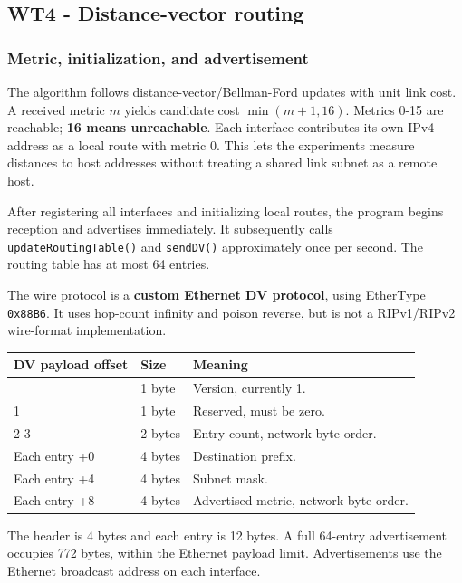 \documentclass[
  a4paper,
  10pt]{article}
\newcounter{none} %
\begin{document}
\newpage

\subsection{WT4 - Distance-vector
routing}\label{wt4---distance-vector-routing}

\subsubsection{Metric, initialization, and
advertisement}\label{metric-initialization-and-advertisement}

The algorithm follows distance-vector/Bellman-Ford updates with unit
link cost. A received metric \(m\) yields candidate cost
\(\min(m+1,16)\). Metrics 0-15 are reachable; \textbf{16 means
unreachable}. Each interface contributes its own IPv4 address as a local
{\ttfamily{}} route with metric 0. This lets the experiments
measure distances to host addresses without treating a shared link
subnet as a remote host.

After registering all interfaces and initializing local routes, the
program begins reception and advertises immediately. It subsequently
calls \texttt{updateRoutingTable()} and \texttt{sendDV()} approximately
once per second. The routing table has at most 64 entries.

The wire protocol is a \textbf{custom Ethernet DV protocol}, using
EtherType \texttt{0x88B6}. It uses hop-count infinity and poison
reverse, but is not a RIPv1/RIPv2 wire-format implementation.

{\def\LTcaptype{none} %
\begin{longtable}[]{@{}lll@{}}
\toprule\noalign{}
DV payload offset & Size & Meaning \\
\midrule\noalign{}
\endhead
\bottomrule\noalign{}
\endlastfoot
0 & 1 byte & Version, currently 1. \\
1 & 1 byte & Reserved, must be zero. \\
2-3 & 2 bytes & Entry count, network byte order. \\
Each entry +0 & 4 bytes & Destination prefix. \\
Each entry +4 & 4 bytes & Subnet mask. \\
Each entry +8 & 4 bytes & Advertised metric, network byte order. \\
\end{longtable}
}

The header is 4 bytes and each entry is 12 bytes. A full 64-entry
advertisement occupies 772 bytes, within the Ethernet payload limit.
Advertisements use the Ethernet broadcast address on each interface.
\end{document}
